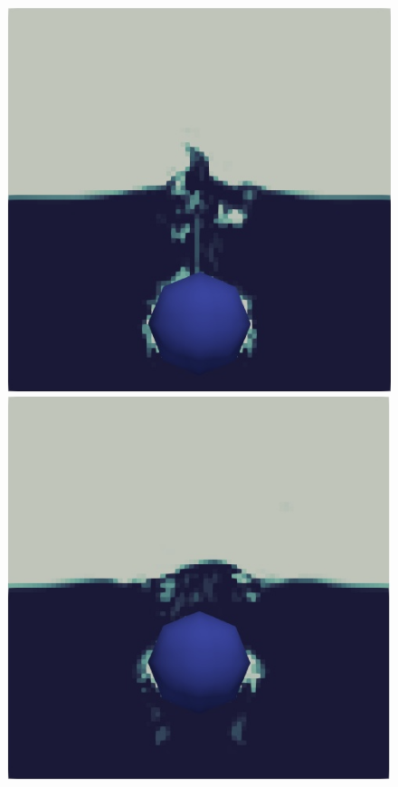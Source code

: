 \begin{figure}[H]
\begin{minipage}{.4\textwidth}
    \end{minipage}%
    \hspace{0.05\textwidth}
    \begin{minipage}{.4\textwidth}
        \centering
        \includegraphics[width=\linewidth]{Images/chap4/water_sphere/sphere_in_water07.png}
    \end{minipage}
    \newline
    \begin{minipage}{.4\textwidth}
        \centering
        \includegraphics[width=\linewidth]{Images/chap4/water_sphere/sphere_in_water09.png}

\end{minipage}
\end{figure}
